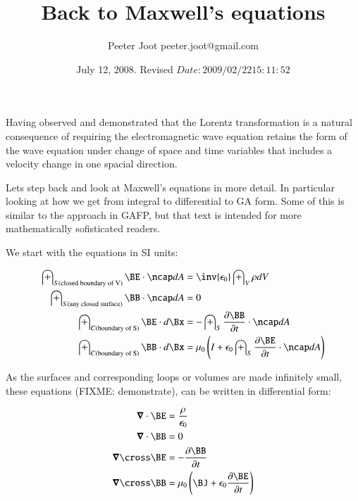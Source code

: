 \documentclass{article}
\title{ Back to Maxwell's equations }
\author{Peeter Joot \quad peeter.joot@gmail.com}
\date{ July 12, 2008. Revised $Date: 2009/02/22 15:11:52 $}
\newcommand{\spacegrad}[0]{\boldsymbol{\nabla}}
\begin{document}
             


\maketitle{}

\section{ }

Having observed and demonstrated that the Lorentz transformation is a natural consequence of requiring the electromagnetic wave equation retains the
form of the wave equation under change of space and time variables that includes a velocity change in one spacial direction.

Lets step back and look at Maxwell's equations in more detail.  In particular looking at how we get from integral to differential
to GA form.  Some of this is similar to the approach in GAFP, but that text is intended for more mathematically sofisticated readers.

We start with the equations in SI units:

\begin{align*}
\int_{S(\text{closed boundary of V})} \BE \cdot \ncap dA &= \inv{\epsilon_0} \int_V \rho dV \\
\int_{S(\text{any closed surface})} \BB \cdot \ncap dA &= 0 \\
\int_{C(\text{boundary of S})} \BE \cdot d\Bx &= - \int_{S} \frac{\partial \BB}{\partial t} \cdot \ncap dA \\
\int_{C(\text{boundary of S})} \BB \cdot d\Bx &= \mu_0\left(I + \epsilon_0\int_{S} \frac{\partial \BE}{\partial t} \cdot \ncap dA\right) \\
\end{align*}

As the surfaces and corresponding loops or volumes are made infinitely small, these equations (FIXME: demonstrate), can be written in differential form:

\begin{align*}
\spacegrad \cdot \BE &= \frac{\rho}{\epsilon_0} \\
\spacegrad \cdot \BB &= 0 \\
\spacegrad \cross \BE &= - \frac{\partial \BB}{\partial t} \\
\spacegrad \cross \BB &= \mu_0\left(\BJ + \epsilon_0 \frac{\partial \BE}{\partial t}\right) \\
\end{align*}
\end{document}
